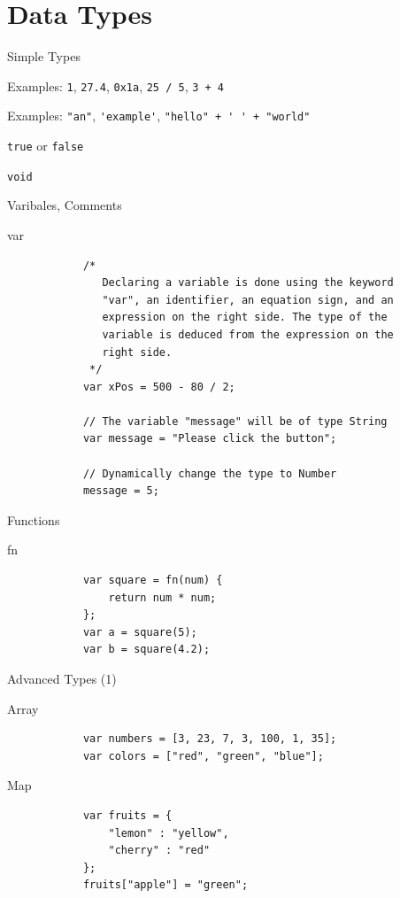 \documentclass[ucs,9pt]{beamer}
\begin{document}
\section{Data Types}
\begin{frame}[fragile]{Simple Types}
\begin{description}
	\addtolength{\itemsep}{\baselineskip}
	\item[Number] Examples: \lstinline!1!, \lstinline!27.4!, \lstinline!0x1a!, \lstinline!25 / 5!, \lstinline!3 + 4!
	\item[String] Examples: \lstinline!"an"!, \lstinline!'example'!, \lstinline!"hello" + ' ' + "world"!
	\item[Bool] \lstinline!true! or \lstinline!false!
	\item[Void] \lstinline!void!
\end{description}
\end{frame}

\begin{frame}[fragile]{Varibales, Comments}
	\begin{block}{var}
		\begin{lstlisting}
			/*
			   Declaring a variable is done using the keyword
			   "var", an identifier, an equation sign, and an
			   expression on the right side. The type of the
			   variable is deduced from the expression on the
			   right side.
			 */
			var xPos = 500 - 80 / 2;

			// The variable "message" will be of type String
			var message = "Please click the button";

			// Dynamically change the type to Number
			message = 5;
		\end{lstlisting}
	\end{block}
\end{frame}

\begin{frame}[fragile]{Functions}
	\begin{block}{fn}
		\begin{lstlisting}
			var square = fn(num) {
			    return num * num;
			};
			var a = square(5);
			var b = square(4.2);
		\end{lstlisting}
	\end{block}
\end{frame}

\begin{frame}[fragile]{Advanced Types (1)}
	\begin{block}{Array}
		\begin{lstlisting}
			var numbers = [3, 23, 7, 3, 100, 1, 35];
			var colors = ["red", "green", "blue"];
		\end{lstlisting}
	\end{block}
	\begin{block}{Map}
		\begin{lstlisting}
			var fruits = {
			    "lemon" : "yellow",
			    "cherry" : "red"
			};
			fruits["apple"] = "green";
		\end{lstlisting}
	\end{block}
\end{frame}
\end{document}
